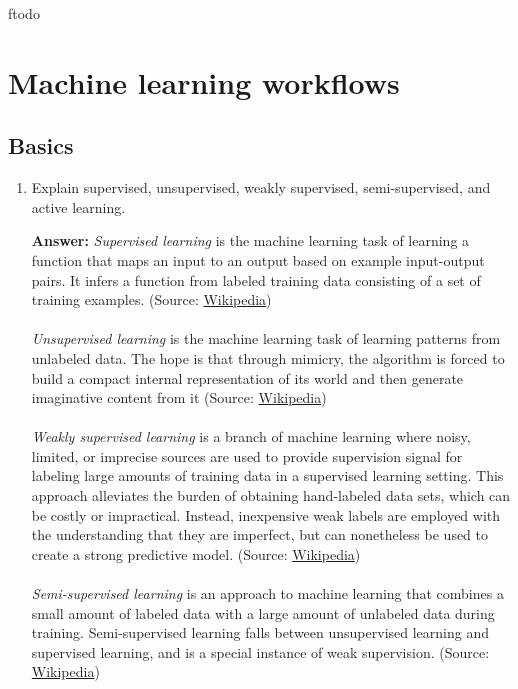 ƒtodo\documentclass{article}
\newenvironment{QandA}{\begin{enumerate}[label=\arabic*.]}{\end{enumerate}}
\newenvironment{answer}{\par\normalfont \textbf{Answer:}}{}
\begin{document}
\section{Machine learning workflows}
\subsection{Basics}
\begin{QandA}
    \item Explain supervised, unsupervised, weakly supervised, semi-supervised, and active learning.
    \begin{answer}
        \textit{Supervised learning} is the machine learning task of learning a function that maps an input to an output based on example input-output pairs. It infers a function from labeled training data consisting of a set of training examples. (Source: \href{https://en.wikipedia.org/wiki/Supervised_learning}{Wikipedia}) \\\\
        \textit{Unsupervised learning} is the machine learning task of learning patterns from unlabeled data. The hope is that through mimicry, the algorithm is forced to build a compact internal representation of its world and then generate imaginative content from it (Source: \href{https://en.wikipedia.org/wiki/Unsupervised_learning}{Wikipedia}) \\\\
        \textit{Weakly supervised learning} is a branch of machine learning where noisy, limited, or imprecise sources are used to provide supervision signal for labeling large amounts of training data in a supervised learning setting. This approach alleviates the burden of obtaining hand-labeled data sets, which can be costly or impractical. Instead, inexpensive weak labels are employed with the understanding that they are imperfect, but can nonetheless be used to create a strong predictive model. (Source: \href{https://en.wikipedia.org/wiki/Weak_supervision}{Wikipedia}) \\\\
        \textit{Semi-supervised learning} is an approach to machine learning that combines a small amount of labeled data with a large amount of unlabeled data during training. Semi-supervised learning falls between unsupervised learning and supervised learning, and is a special instance of weak supervision. (Source: \href{https://en.wikipedia.org/wiki/Semi-supervised_learning}{Wikipedia}) \\\\

\end{answer}
\end{QandA}
\end{document}
